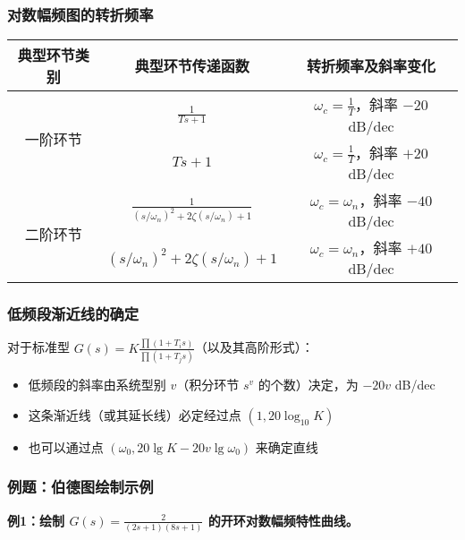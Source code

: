 \subsubsection{对数幅频图的转折频率}

\begin{center}
\begin{tabular}{|c|c|c|}
\hline
\textbf{典型环节类别} & \textbf{典型环节传递函数} & \textbf{转折频率及斜率变化} \\
\hline
\multirow{2}{*}{一阶环节} & $\displaystyle\frac{1}{Ts+1}$ & $\omega_c = \frac{1}{T}$，斜率 $-20$ dB/dec \\
\cline{2-3}
& $Ts+1$ & $\omega_c = \frac{1}{T}$，斜率 $+20$ dB/dec \\
\hline
\multirow{2}{*}{二阶环节} & $\displaystyle\frac{1}{(s/\omega_n)^2+2\zeta(s/\omega_n)+1}$ & $\omega_c = \omega_n$，斜率 $-40$ dB/dec \\
\cline{2-3}
& $(s/\omega_n)^2+2\zeta(s/\omega_n)+1$ & $\omega_c = \omega_n$，斜率 $+40$ dB/dec \\
\hline
\end{tabular}
\end{center}

\subsubsection{低频段渐近线的确定}

对于标准型 $G(s) = K \frac{\prod(1+T_i s)}{\prod(1+T_j s)}$（以及其高阶形式）：
\begin{itemize}
    \item 低频段的斜率由系统型别 $v$（积分环节 $s^v$ 的个数）决定，为 $-20v$ dB/dec
    \item 这条渐近线（或其延长线）必定经过点 $(1, 20\log_{10}K)$
    \item 也可以通过点 $(\omega_0, 20\lg K - 20v\lg\omega_0)$ 来确定直线
\end{itemize}

\subsubsection{例题：伯德图绘制示例}

\textbf{例1：绘制 $G(s) = \frac{2}{(2s+1)(8s+1)}$ 的开环对数幅频特性曲线。}

